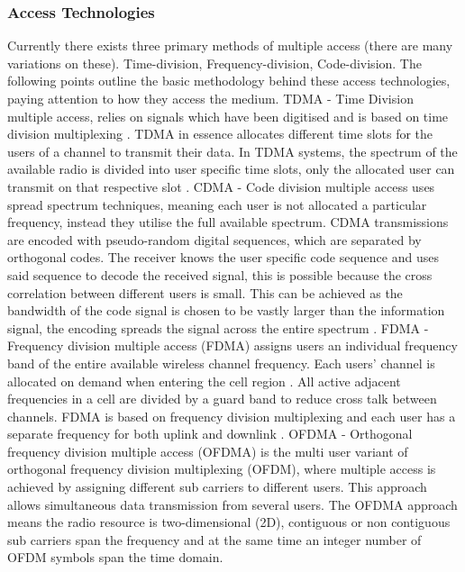 \documentclass{article}
\begin{document}
\subsubsection{Access Technologies}
Currently there exists three primary methods of multiple access (there are many variations on these). Time-division, Frequency-division, Code-division. The following points outline the basic methodology behind these access technologies, paying attention to how they access the medium. TDMA - Time Division multiple access,  relies on signals which have been digitised and is based on time division multiplexing \cite{tdma_info}. TDMA in essence allocates different time slots for the users of a channel to transmit their data. In TDMA systems, the spectrum of the available radio is divided into user specific time slots, only the allocated user can transmit on that respective slot \cite{tdma_info}.
CDMA - Code division multiple access uses spread spectrum techniques, meaning each user is not allocated a particular frequency, instead they utilise the full available spectrum. CDMA transmissions are encoded with pseudo-random digital sequences, which are separated by orthogonal codes\cite{cdma_info}. The receiver knows the user specific code sequence and uses said sequence to decode the received signal, this is possible because the cross correlation between different users is small. This can be achieved as the bandwidth of the code signal is chosen to be vastly larger than the information signal, the encoding spreads the signal across the entire spectrum \cite{cdma_info}.
FDMA - Frequency division multiple access (FDMA) assigns users an individual frequency band of the entire available wireless channel frequency. Each users' channel is allocated on demand when entering the cell region \cite[Section...]{fdma_info}. All active adjacent frequencies in a cell are divided by a guard band to reduce cross talk between channels. FDMA is based on frequency division multiplexing and each user has a separate frequency for both uplink and downlink \cite{fdma_info}. OFDMA - Orthogonal frequency division multiple access (OFDMA) is the multi user variant of orthogonal frequency division multiplexing (OFDM), where multiple access is achieved by assigning different sub carriers to different users. This approach allows simultaneous data transmission from several users. The OFDMA approach means the radio resource is two-dimensional (2D), contiguous or non contiguous sub carriers span the frequency and at the same time an integer number of OFDM symbols span the time domain\cite{ofdma_info}.
\end{document}
